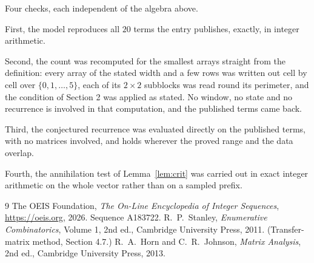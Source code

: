 \documentclass[11pt,a4paper]{article}
\theoremstyle{plain}
\theoremstyle{definition}
\begin{document}
Four checks, each independent of the algebra above.

First, the model reproduces all $20$ terms the entry publishes, exactly, in integer
arithmetic.

Second, the count was recomputed for the smallest arrays straight from the definition: every
array of the stated width and a few rows was written out cell by cell over $\{0,1,\dots,5\}$, each of
its $2\times2$ subblocks was read round its perimeter, and the condition of Section 2 was
applied as stated. No window, no state and no recurrence is involved in that computation, and
the published terms came back.

Third, the conjectured recurrence was evaluated directly on the published terms, with no
matrices involved, and holds wherever the proved range and the data overlap.

Fourth, the annihilation test of Lemma~\ref{lem:crit} was carried out in exact integer
arithmetic on the whole vector rather than on a sampled prefix.

\begin{thebibliography}{9}
 The OEIS Foundation, \emph{The On-Line Encyclopedia of Integer
Sequences}, \url{https://oeis.org}, 2026. Sequence A183722.
 R.~P.~Stanley, \emph{Enumerative Combinatorics}, Volume 1, 2nd ed.,
Cambridge University Press, 2011. (Transfer-matrix method, Section 4.7.)
 R.~A.~Horn and C.~R.~Johnson, \emph{Matrix Analysis}, 2nd ed., Cambridge
University Press, 2013.
\end{thebibliography}
\end{document}
